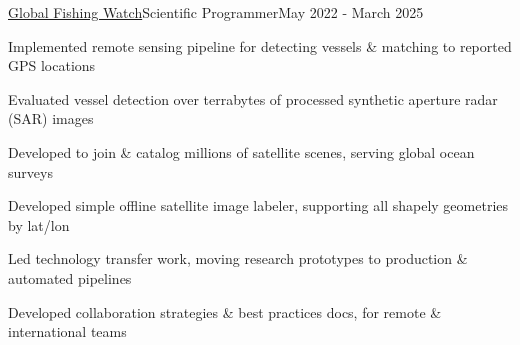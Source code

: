 \documentclass{article}
\newenvironment{**mylist}[4][]%
{%
\subsubsection*{%
    \censor{#2}\tabb #3%
    \if\relax\detokenize{#1}\relax
    \else
      {\;\;(#1)}%
    \fi
    \hfill #4%
}%

\small
  \begin{itemize}%
    \setlength{\topsep}{.2pt}%
    \setlength{\partopsep}{0pt}
    \setlength{\itemsep}{.6pt}%
    \setlength{\parskip}{0pt}%
    \setlength{\parsep}{0pt}%
}%
{%
  \end{itemize}%
}
\begin{document}
\begin{**mylist}{\href{https://globalfishingwatch.org/}{Global Fishing Watch}}{Scientific Programmer}{May 2022 - March 2025}
\item Implemented remote sensing pipeline for detecting vessels \& matching to reported GPS locations
\item Evaluated vessel detection over terrabytes of processed synthetic aperture radar (SAR) images
\item Developed  to join \& catalog millions of satellite scenes, serving global ocean surveys
\item Developed simple offline satellite image labeler, supporting all shapely geometries by lat/lon
\item Led technology transfer work, moving research prototypes to production \& automated pipelines
\item Developed collaboration strategies \& best practices docs, for remote \& international teams
\end{**mylist}
\end{document}
